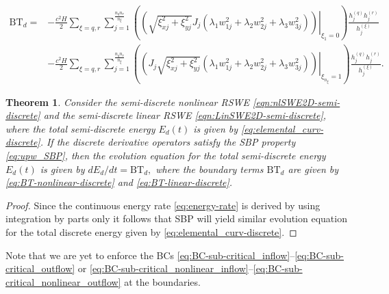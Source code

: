 \documentclass{article}
\numberwithin{equation}{section}
\newtheorem{theorem}{Theorem}
\theoremstyle{definition}
\begin{document}
{%
\begin{equation}\label{eq:BT-linear-discrete-eigen-decompose}
\begin{split}
\mathrm{BT}_d= &-\frac{c^2H}{2}\sum_{\xi = q, r}\sum_{j=1}^{\frac{n_qn_r}{n_\xi}} \left(\left.\left(\sqrt{\xi_{xj}^2 + \xi_{yj}^2}J_j\left(\lambda_1w_{1j}^2 + \lambda_2w_{2j}^2 + \lambda_3w_{3j}^2\right)\right)\right|_{\xi_{1} = 0} \right)
\frac{h_j^{(q)}h_j^{(r)}}{h_j^{(\xi)}}
%
\\
&
-
%
\frac{c^2H}{2}\sum_{\xi = q, r}\sum_{j=1}^{\frac{n_qn_r}{n_\xi}} \left( \left.\left(J_j\sqrt{\xi_{xj}^2 + \xi_{yj}^2}\left(\lambda_1w_{1j}^2 + \lambda_2w_{2j}^2 + \lambda_3w_{3j}^2\right)\right)\right|_{\xi_{n_\xi} = 1}\right) \frac{h_j^{(q)}h_j^{(r)}}{h_j^{(\xi)}}.
\end{split}
\end{equation}
}
\begin{theorem}
    Consider the semi-discrete nonlinear  RSWE \eqref{eqn:nlSWE2D-semi-discrete} and the semi-discrete linear  RSWE \eqref{eqn:LinSWE2D-semi-discrete}, where the total semi-discrete energy $E_d(t)$ is given by \eqref{eq:elemental_curv-discrete}. If the discrete derivative operators satisfy the SBP property \eqref{eq:upw_SBP}, then   the evolution equation for the total semi-discrete  energy $E_d(t)$ is given by 
    $
    {dE_d}/{dt} = \mathrm{BT}_d,
    $
    where the boundary terms $\mathrm{BT}_d$ are given by  \eqref{eq:BT-nonlinear-discrete} and  \eqref{eq:BT-linear-discrete}.
\end{theorem}
\begin{proof}
    Since the continuous energy rate \eqref{eq:energy-rate} is derived by using integration by parts only it follows that SBP will yield similar evolution equation for the total discrete energy given by \eqref{eq:elemental_curv-discrete}.
\end{proof}
Note that we are yet to enforce the BCs \eqref{eq:BC-sub-critical_inflow}--\eqref{eq:BC-sub-critical_outflow} or \eqref{eq:BC-sub-critical_nonlinear_inflow}--\eqref{eq:BC-sub-critical_nonlinear_outflow} at the boundaries.
\end{document}
